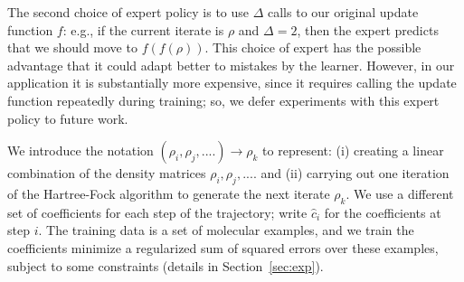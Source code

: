 \documentclass[twoside,11pt]{article}
\begin{document}
The second choice of expert policy is to use $\Delta$ calls to our original update function $f$: e.g., if the current iterate is $\rho$ and $\Delta=2$, then the expert predicts that we should move to $f(f(\rho))$.  This choice of expert has the possible advantage that it could adapt better to mistakes by the learner. However, in our application it is substantially more expensive, since it requires calling the update function repeatedly during training; so, we defer experiments with this expert policy to future work.

We introduce the notation $(\rho_i, \rho_j, ....) \rightarrow \rho_k $ to represent: (i) creating a linear combination of the density matrices $\rho_i, \rho_j, ....$ and (ii) carrying out one iteration of the Hartree-Fock algorithm to generate the next iterate $\rho_k$.  We use a different set of coefficients for each step of the trajectory; write $\hat c_i$ for the coefficients at step $i$.
The training data is a set of molecular examples, and we train the coefficients minimize a regularized sum of squared errors over these examples, subject to some constraints (details in Section~\ref{sec:exp}).




\end{document}
